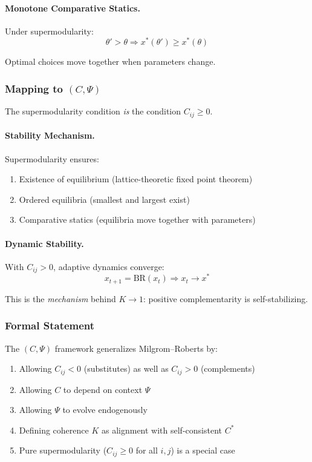 \paragraph{Monotone Comparative Statics.}
Under supermodularity:
\begin{equation}
  \theta' > \theta \Rightarrow x^*(\theta') \geq x^*(\theta)
\end{equation}

Optimal choices move together when parameters change.

\subsubsection{Mapping to $(C, \Psi)$}

The supermodularity condition \emph{is} the condition $C_{ij} \geq 0$.

\paragraph{Stability Mechanism.}
Supermodularity ensures:
\begin{enumerate}
  \item Existence of equilibrium (lattice-theoretic fixed point theorem)
  \item Ordered equilibria (smallest and largest exist)
  \item Comparative statics (equilibria move together with parameters)
\end{enumerate}

\paragraph{Dynamic Stability.}
With $C_{ij} > 0$, adaptive dynamics converge:
\begin{equation}
  x_{t+1} = \text{BR}(x_t) \Rightarrow x_t \to x^*
\end{equation}

This is the \emph{mechanism} behind $K \to 1$: positive complementarity is self-stabilizing.

\subsubsection{Formal Statement}

\begin{proposition}
The $(C, \Psi)$ framework generalizes Milgrom--Roberts by:
\begin{enumerate}
  \item Allowing $C_{ij} < 0$ (substitutes) as well as $C_{ij} > 0$ (complements)
  \item Allowing $C$ to depend on context $\Psi$
  \item Allowing $\Psi$ to evolve endogenously
  \item Defining coherence $K$ as alignment with self-consistent $C^*$
  \item Pure supermodularity ($C_{ij} \geq 0$ for all $i,j$) is a special case
\end{enumerate}
\end{proposition}

